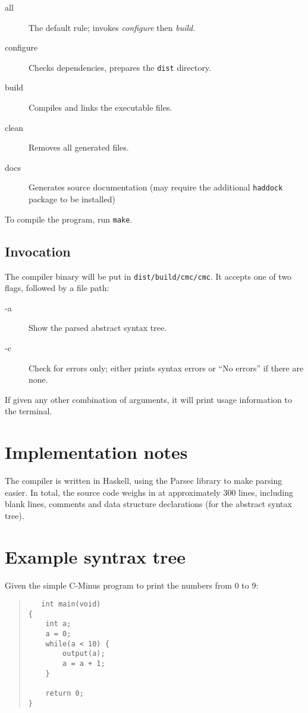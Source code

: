 \documentclass[12pt]{amsart}
\begin{document}
\begin{description}
\item[all] The default rule; invokes \emph{configure} then
  \emph{build}. 
\item[configure] Checks dependencies, prepares the \verb|dist| directory.
\item[build] Compiles and links the executable files.
\item[clean] Removes all generated files.
\item[docs] Generates source documentation (may require the additional
  \verb|haddock| package to be installed)
\end{description}

To compile the program, run \verb|make|.

\subsection{Invocation}
The compiler binary will be put in \verb|dist/build/cmc/cmc|. It
accepts one of two flags, followed by a file path:

\begin{description}
\item[-a] Show the parsed abstract syntax tree.
\item[-c] Check for errors only; either prints syntax errors or ``No
  errors'' if there are none.
\end{description}

If given any other combination of arguments, it will print usage
information to the terminal.


\section{Implementation notes}
\label{implementation}

The compiler is written in Haskell, using the Parsec library to make
parsing easier. In total, the source code weighs in at approximately
300 lines, including blank lines, comments and data structure
declarations (for the abstract syntax tree).




\section{Example syntrax tree}
Given the simple C-Minus program to print the numbers from 0 to 9:

\begin{verse}
\begin{verbatim}
   int main(void)
{
    int a;
    a = 0;
    while(a < 10) {
        output(a);
        a = a + 1;
    }

    return 0;
}
\end{verbatim}
\end{verse}
\end{document}
